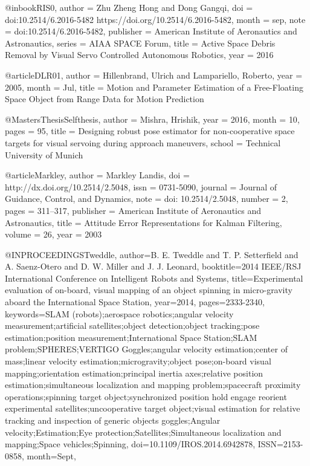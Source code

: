 @inbook{RIS0,
	author = {Zhu Zheng Hong} and {Dong Gangqi},
	doi = {doi:10.2514/6.2016-5482 https://doi.org/10.2514/6.2016-5482},
	month = sep,
	note = {doi:10.2514/6.2016-5482},
	publisher = {American Institute of Aeronautics and Astronautics},
	series = {AIAA SPACE Forum},
	title = {Active Space Debris Removal by Visual Servo Controlled Autonomous Robotics},
	year = {2016}
}

@article{DLR01,
author = {Hillenbrand, Ulrich and Lampariello, Roberto},
year = {2005},
month = {Jul},
title = {Motion and Parameter Estimation of a Free-Floating Space Object from Range Data for Motion Prediction}
}

@MastersThesis{Selfthesis,
author = {Mishra, Hrishik},
year = {2016},
month = {10},
pages = {95},
title = {Designing robust pose estimator for non-cooperative space targets for visual servoing during approach maneuvers},
school = {Technical University of Munich}
}

@article{Markley,	
	author = {Markley Landis},
	doi = {http://dx.doi.org/10.2514/2.5048},
	issn = {0731-5090},
	journal = {Journal of Guidance, Control, and Dynamics},
	note = {doi: 10.2514/2.5048},
	number = {2},
	pages = {311--317},
	publisher = {American Institute of Aeronautics and Astronautics},
	title = {{Attitude Error Representations for Kalman Filtering}},
	volume = {26},
	year = {2003}
}

@INPROCEEDINGS{Tweddle, 
author={B. E. Tweddle and T. P. Setterfield and A. Saenz-Otero and D. W. Miller and J. J. Leonard}, 
booktitle={2014 IEEE/RSJ International Conference on Intelligent Robots and Systems}, 
title={Experimental evaluation of on-board, visual mapping of an object spinning in micro-gravity aboard the International Space Station}, 
year={2014}, 
pages={2333-2340}, 
keywords={SLAM (robots);aerospace robotics;angular velocity measurement;artificial satellites;object detection;object tracking;pose estimation;position measurement;International Space Station;SLAM problem;SPHERES;VERTIGO Goggles;angular velocity estimation;center of mass;linear velocity estimation;microgravity;object pose;on-board visual mapping;orientation estimation;principal inertia axes;relative position estimation;simultaneous localization and mapping problem;spacecraft proximity operations;spinning target object;synchronized position hold engage reorient experimental satellites;uncooperative target object;visual estimation for relative tracking and inspection of generic objects goggles;Angular velocity;Estimation;Eye protection;Satellites;Simultaneous localization and mapping;Space vehicles;Spinning}, 
doi={10.1109/IROS.2014.6942878}, 
ISSN={2153-0858}, 
month={Sept},}

